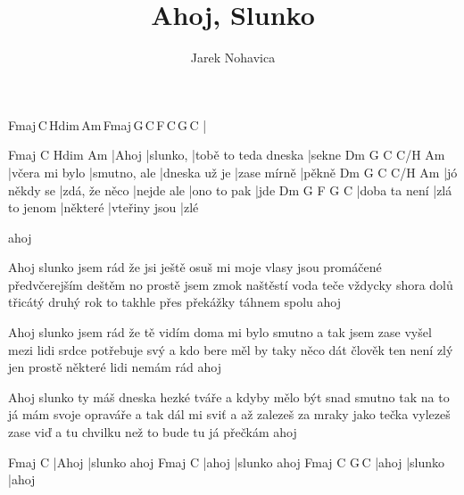 \documentclass{song}
\title{Ahoj, Slunko}
\author{Jarek Nohavica}
\begin{document}
\strophe
Fmaj\7\,C\,Hdim\,Am\7\,Fmaj\7\,G\,C\,F\,C\,G\,C
|
\endstrophe

\strophe
Fmaj\7 C       Hdim                 Am\7
|Ahoj  |slunko, |tobě to teda dneska |sekne
Dm\7           G           C             C/H         Am
|včera mi bylo |smutno, ale |dneska už je |zase mírně |pěkně
Dm\7         G        C               C/H         Am
|jó někdy se |zdá, že něco |nejde ale |ono to pak |jde
Dm\7          G             F        G             C
|doba ta není |zlá to jenom |některé |vteřiny jsou |zlé

ahoj
\endstrophe

\strophe*
Ahoj slunko jsem rád že jsi ještě
osuš mi moje vlasy jsou promáčené předvčerejším deštěm
no prostě jsem zmok naštěstí voda teče vždycky shora dolů
třicátý druhý rok to takhle přes překážky táhnem spolu
ahoj
\endstrophe

\strophe*
Ahoj slunko jsem rád že tě vidím
doma mi bylo smutno a tak jsem zase vyšel mezi lidi
srdce potřebuje svý a kdo bere měl by taky něco dát
člověk ten není zlý jen prostě některé lidi nemám rád
ahoj
\endstrophe

\strophe*
Ahoj slunko ty máš dneska hezké tváře
a kdyby mělo být snad smutno tak na to já mám svoje opraváře
a tak dál mi sviť a až zalezeš za mraky jako tečka
vylezeš zase viď a tu chvilku než to bude tu já přečkám
ahoj
\endstrophe

\strophe
Fmaj\7 C
|Ahoj  |slunko ahoj
Fmaj\7 C
|ahoj  |slunko ahoj
Fmaj\7 C       G\,C
|ahoj  |slunko |ahoj
\endstrophe

\end{document}
